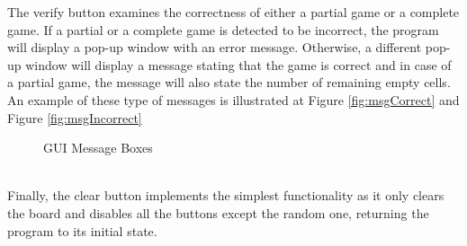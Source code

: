\documentclass[12pt,a4paper]{article} %
\begin{document}
The verify button examines the correctness of either a partial game or a complete game. If a partial or a complete game is detected to be incorrect, the program will display a pop-up window with an error message.  Otherwise, a different pop-up window will display a message stating that the game is correct and in case of a partial game, the message will also state the number of remaining empty cells. An example of these type of messages is illustrated at Figure \ref{fig:msgCorrect} and Figure \ref{fig:msgIncorrect}
\begin{figure}[ht!]
\label{fig:msgBox}
\begin{center}
%
%
\end{center}
\caption{%
GUI Message Boxes
}%
\end{figure}
\newline
\\Finally, the clear button implements the simplest functionality as it only clears the board and disables all the buttons except the random one, returning the program to its initial state.
\end{document}

